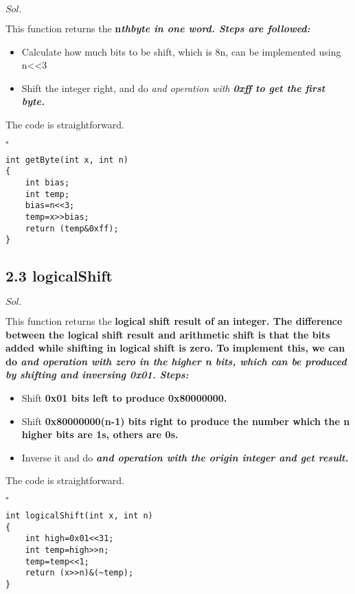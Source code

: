 \documentclass[a4paper, 11pt]{article}
\newenvironment{sol}[1] {\par \noindent $#1.$} {\par \hfill $\square$}
\begin{document}
\begin{sol}{Sol}

This function returns the \bfseries n\itshape th\normalfont \mdseries byte in one word. Steps are followed:

\begin{itemize}
    \item Calculate how much bits to be shift, which is 8n, can be implemented using n\textless\textless 3
    \item Shift the integer right, and do \itshape and \normalfont operation with \bfseries 0xff \mdseries to get the first byte.
\end{itemize}

The code is straightforward.
\end{sol}
\begin{lstlisting}
int getByte(int x, int n)
{
    int bias;
    int temp;
    bias=n<<3;
    temp=x>>bias;
    return (temp&0xff);
}
\end{lstlisting}

\subsection*{2.3 logicalShift}

\begin{sol}{Sol}

This function returns the \bfseries logical shift \mdseries result of an integer. The difference between the logical shift result and arithmetic shift is that the bits added while shifting in logical shift is zero. To implement this, we can do \itshape \bfseries and \mdseries \normalfont operation with zero in the higher \itshape\bfseries n \mdseries\normalfont bits, which can be produced by shifting and inversing \bfseries 0x01\mdseries. Steps:

\begin{itemize}
    \item Shift \bfseries 0x01  bits left to produce \bfseries 0x80000000\mdseries.
    \item Shift \bfseries 0x80000000\mdseries (n-1) bits right to produce the number which the n higher bits are 1s, others are 0s.
    \item Inverse it and do \itshape\bfseries and \normalfont\mdseries operation with the origin integer and get result.
\end{itemize}

The code is straightforward.
\end{sol}
\begin{lstlisting}
int logicalShift(int x, int n)
{
    int high=0x01<<31;
    int temp=high>>n;
    temp=temp<<1;
    return (x>>n)&(~temp);
}
\end{lstlisting}
\end{document}
